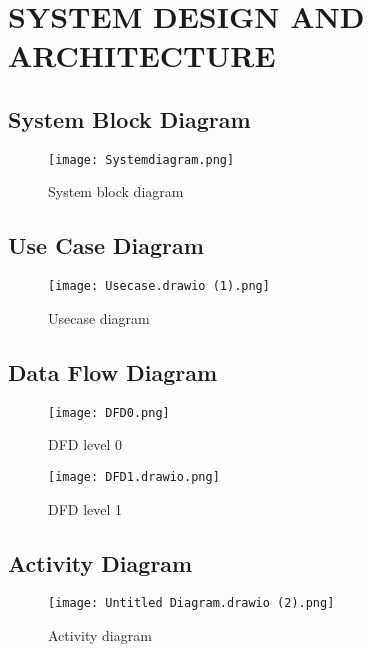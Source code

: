 \newpage

\section{SYSTEM DESIGN AND ARCHITECTURE}
\subsection{System Block Diagram}
\vspace{1in}
\begin{figure}[h]
    \centering
    \texttt{[image: Systemdiagram.png]}
    \caption{System block diagram}
    \label{Figure 2: System Block Diagram}
\end{figure}

\newpage
\subsection{Use Case Diagram}
\vspace{1in}
\begin{figure}[h]
    \centering
    \texttt{[image: Usecase.drawio (1).png]}
    \caption{Usecase diagram}
    \label{Figure 3: Usecase Diagram}
\end{figure}

\newpage
\subsection{Data Flow Diagram}
\vspace{1in}
\begin{figure}[h]
    \centering
    \texttt{[image: DFD0.png]}
    \caption{DFD level 0}
    \label{Figure 4: DFD Level 0}
\end{figure}

\newpage
\begin{figure}[h]
    \centering
    \texttt{[image: DFD1.drawio.png]}
    \caption{DFD level 1}
    \label{Figure 5: DFD Level 1}
\end{figure}

\newpage
\subsection{Activity Diagram}
\vspace{1in}
\begin{figure}[h]
    \centering
    \texttt{[image: Untitled Diagram.drawio (2).png]}
    \caption{Activity diagram}
    \label{Figure 6: Activity Diagram}
\end{figure}

